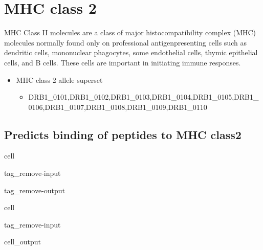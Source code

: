 \documentclass[letterpaper,10pt,english]{jupyterBook}
\begin{document}
\section{MHC class 2}
\label{\detokenize{ipynb/chapter2:mhc-class-2}}
\sphinxAtStartPar
MHC Class II molecules are a class of major histocompatibility complex (MHC) molecules normally found only on professional antigen\sphinxhyphen{}presenting cells such as dendritic cells, mononuclear phagocytes, some endothelial cells, thymic epithelial cells, and B cells. These cells are important in initiating immune responses.
\begin{itemize}
\item {} 
\sphinxAtStartPar
MHC class 2 allele superset
\begin{itemize}
\item {} 
\sphinxAtStartPar
DRB1\_0101,DRB1\_0102,DRB1\_0103,DRB1\_0104,DRB1\_0105,DRB1\_0106,DRB1\_0107,DRB1\_0108,DRB1\_0109,DRB1\_0110

\end{itemize}

\end{itemize}


\subsection{Predicts binding of peptides to MHC class2}
\label{\detokenize{ipynb/chapter2:predicts-binding-of-peptides-to-mhc-class2}}
\begin{sphinxuseclass}{cell}
\begin{sphinxuseclass}{tag_remove-input}
\begin{sphinxuseclass}{tag_remove-output}
\end{sphinxuseclass}
\end{sphinxuseclass}
\end{sphinxuseclass}
\begin{sphinxuseclass}{cell}
\begin{sphinxuseclass}{tag_remove-input}\begin{sphinxVerbatimOutput}

\begin{sphinxuseclass}{cell_output}
\noindent{}

\end{sphinxuseclass}\end{sphinxVerbatimOutput}

\end{sphinxuseclass}
\end{sphinxuseclass}
\end{document}
